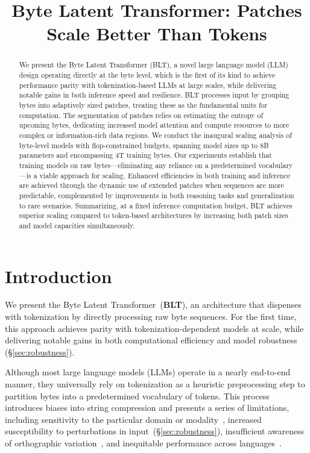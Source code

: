 \title{Byte Latent Transformer: Patches Scale Better Than Tokens}

\begin{abstract}
We present the Byte Latent Transformer ({\textsc BLT}), a novel large language model (LLM) design operating directly at the byte level, which is the first of its kind to achieve performance parity with tokenization-based LLMs at large scales, while delivering notable gains in both inference speed and resilience.
{\textsc BLT} processes input by grouping bytes into adaptively sized patches, treating these as the fundamental units for computation. The segmentation of patches relies on estimating the entropy of upcoming bytes, dedicating increased model attention and compute resources to more complex or information-rich data regions. We conduct the inaugural scaling analysis of byte-level models with flop-constrained budgets, spanning model sizes up to 8B parameters and encompassing 4T training bytes. Our experiments establish that training models on raw bytes—eliminating any reliance on a predetermined vocabulary—is a viable approach for scaling. Enhanced efficiencies in both training and inference are achieved through the dynamic use of extended patches when sequences are more predictable, complemented by improvements in both reasoning tasks and generalization to rare scenarios. Summarizing, at a fixed inference computation budget, {\textsc BLT} achieves superior scaling compared to token-based architectures by increasing both patch sizes and model capacities simultaneously.
\end{abstract}

\section{Introduction}
\label{section:intro}

We present the Byte Latent Transformer~(\textbf{BLT}), an architecture that dispenses with tokenization by directly processing raw byte sequences. For the first time, this approach achieves parity with tokenization-dependent models at scale, while delivering notable gains in both computational efficiency and model robustness (\S\ref{sec:robustness}).

Although most large language models (LLMs) operate in a nearly end-to-end manner, they universally rely on tokenization as a heuristic preprocessing step to partition bytes into a predetermined vocabulary of tokens. This process introduces biases into string compression and presents a series of limitations, including sensitivity to the particular domain or modality~\citep{dagangetting}, increased susceptibility to perturbations in input~(\S\ref{sec:robustness}), insufficient awareness of orthographic variation~\citep{edman2024cute}, and inequitable performance across languages~\citep{liang2023xlm,petrov2024language,limisiewicz2024myte}.

